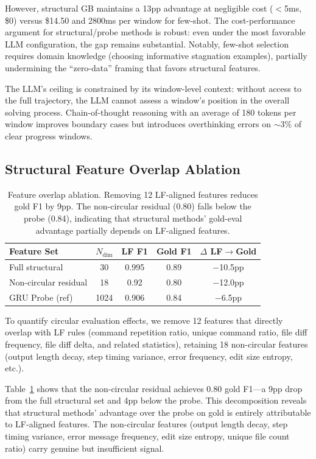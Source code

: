 \documentclass[11pt,a4paper]{article}
\begin{document}
However, structural GB maintains a 13pp advantage at negligible cost ($<$5ms, \$0) versus \$14.50 and 2800ms per window for few-shot.
The cost-performance argument for structural/probe methods is robust: even under the most favorable LLM configuration, the gap remains substantial.
Notably, few-shot selection requires domain knowledge (choosing informative stagnation examples), partially undermining the ``zero-data'' framing that favors structural features.

The LLM's ceiling is constrained by its window-level context: without access to the full trajectory, the LLM cannot assess a window's position in the overall solving process.
Chain-of-thought reasoning with an average of 180 tokens per window improves boundary cases but introduces overthinking errors on $\sim$3\% of clear progress windows.

\subsection{Structural Feature Overlap Ablation}
\label{sec:ablation}

\begin{table}[t]
\centering
\small
\begin{tabular}{lcccc}
\toprule
\textbf{Feature Set} & \textbf{$N_\text{dim}$} & \textbf{LF F1} & \textbf{Gold F1} & \textbf{$\Delta$ LF$\to$Gold} \\
\midrule
Full structural & 30 & 0.995 & 0.89 & $-$10.5pp \\
Non-circular residual & 18 & 0.92 & 0.80 & $-$12.0pp \\
\midrule
GRU Probe (ref) & 1024 & 0.906 & 0.84 & $-$6.5pp \\
\bottomrule
\end{tabular}
\caption{Feature overlap ablation. Removing 12 LF-aligned features reduces gold F1 by 9pp. The non-circular residual (0.80) falls below the probe (0.84), indicating that structural methods' gold-eval advantage partially depends on LF-aligned features.}
\label{tab:ablation}
\end{table}

To quantify circular evaluation effects, we remove 12 features that directly overlap with LF rules (command repetition ratio, unique command ratio, file diff frequency, file diff delta, and related statistics), retaining 18 non-circular features (output length decay, step timing variance, error frequency, edit size entropy, etc.).

Table~\ref{tab:ablation} shows that the non-circular residual achieves 0.80 gold F1---a 9pp drop from the full structural set and 4pp below the probe.
This decomposition reveals that structural methods' advantage over the probe on gold is entirely attributable to LF-aligned features.
The non-circular features (output length decay, step timing variance, error message frequency, edit size entropy, unique file count ratio) carry genuine but insufficient signal.
\end{document}

